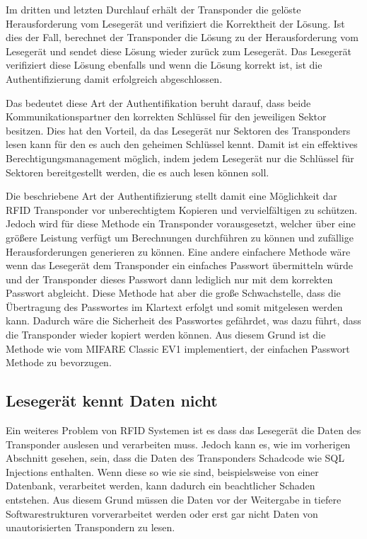 \documentclass[conference]{IEEEtran}
\begin{document}
Im dritten und letzten Durchlauf erhält der Transponder die gelöste Herausforderung vom Lesegerät und verifiziert die Korrektheit der Lösung. Ist dies der Fall, berechnet der Transponder die Lösung zu der Herausforderung  vom Lesegerät und sendet diese Lösung wieder zurück zum Lesegerät. Das Lesegerät verifiziert diese Lösung ebenfalls und wenn die Lösung korrekt ist, ist die Authentifizierung damit erfolgreich abgeschlossen.

Das bedeutet diese Art der Authentifikation beruht darauf, dass beide Kommunikationspartner den korrekten Schlüssel für den jeweiligen Sektor besitzen. Dies hat den Vorteil, da das Lesegerät nur Sektoren des Transponders lesen kann für den es auch den geheimen Schlüssel kennt. Damit ist ein effektives Berechtigungsmanagement möglich, indem jedem Lesegerät nur die Schlüssel für Sektoren bereitgestellt werden, die es auch lesen können soll.

Die beschriebene Art der Authentifizierung stellt damit eine Möglichkeit dar RFID Transponder vor unberechtigtem Kopieren und vervielfältigen zu schützen. Jedoch wird für diese Methode ein Transponder vorausgesetzt, welcher über eine größere Leistung verfügt um Berechnungen durchführen zu können und zufällige Herausforderungen generieren zu können. Eine andere einfachere Methode wäre wenn das Lesegerät dem Transponder ein einfaches Passwort übermitteln würde und der Transponder dieses Passwort dann lediglich nur mit dem korrekten Passwort abgleicht. Diese Methode hat aber die große Schwachstelle, dass die Übertragung des Passwortes im Klartext erfolgt und somit mitgelesen werden kann. Dadurch wäre die Sicherheit des Passwortes gefährdet, was dazu führt, dass die Transponder wieder kopiert werden können. Aus diesem Grund ist die Methode wie vom MIFARE Classic EV1 implementiert, der einfachen Passwort Methode zu bevorzugen.

\subsection{Lesegerät kennt Daten nicht}
Ein weiteres Problem von RFID Systemen ist es dass das Lesegerät die Daten des Transponder auslesen und verarbeiten muss. Jedoch kann es, wie im vorherigen Abschnitt gesehen, sein, dass die Daten des Transponders Schadcode wie SQL Injections enthalten. Wenn diese so wie sie sind, beispielsweise von einer Datenbank, verarbeitet werden, kann dadurch ein beachtlicher Schaden entstehen. Aus diesem Grund müssen die Daten vor der Weitergabe in tiefere Softwarestrukturen vorverarbeitet werden oder erst gar nicht Daten von unautorisierten Transpondern zu lesen.
\end{document}
